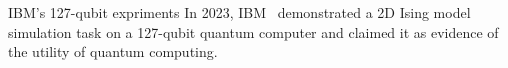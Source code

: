 \documentclass[10pt]{beamer}
\begin{document}
\begin{CJK}{UTF8}{gbsn}
\begin{frame}[fragile]{IBM's 127-qubit expriments}
 In 2023, IBM~ demonstrated a 2D Ising model simulation task on a 127-qubit quantum computer and claimed it as evidence of the utility of quantum computing.
  \begin{figure}
    \centering
    \begin{subfigure}[t]{0.3\textwidth}
    \end{subfigure}
    \hfill
    \begin{subfigure}[t]{0.65\textwidth}
    \end{subfigure}
  \end{figure}
\end{frame}
\end{CJK}
\end{document}
